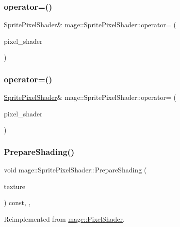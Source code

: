 \subsubsection{\texorpdfstring{operator=()}{operator=()}\hspace{0.1cm}{\footnotesize\ttfamily [1/2]}}
{\footnotesize\ttfamily \hyperlink{classmage_1_1_sprite_pixel_shader}{Sprite\+Pixel\+Shader}\& mage\+::\+Sprite\+Pixel\+Shader\+::operator= (\begin{DoxyParamCaption}\item[{const \hyperlink{classmage_1_1_sprite_pixel_shader}{Sprite\+Pixel\+Shader} \&}]{pixel\+\_\+shader }\end{DoxyParamCaption})\hspace{0.3cm}{\ttfamily [delete]}}

\hypertarget{classmage_1_1_sprite_pixel_shader_ad982c266c5ba3510009a3f5e7519e284}{}\label{classmage_1_1_sprite_pixel_shader_ad982c266c5ba3510009a3f5e7519e284} 
\subsubsection{\texorpdfstring{operator=()}{operator=()}\hspace{0.1cm}{\footnotesize\ttfamily [2/2]}}
{\footnotesize\ttfamily \hyperlink{classmage_1_1_sprite_pixel_shader}{Sprite\+Pixel\+Shader}\& mage\+::\+Sprite\+Pixel\+Shader\+::operator= (\begin{DoxyParamCaption}\item[{\hyperlink{classmage_1_1_sprite_pixel_shader}{Sprite\+Pixel\+Shader} \&\&}]{pixel\+\_\+shader }\end{DoxyParamCaption})\hspace{0.3cm}{\ttfamily [delete]}}

\hypertarget{classmage_1_1_sprite_pixel_shader_a8c0c4daf36c74822a772b1a38e8d876a}{}\label{classmage_1_1_sprite_pixel_shader_a8c0c4daf36c74822a772b1a38e8d876a} 
\subsubsection{\texorpdfstring{Prepare\+Shading()}{PrepareShading()}}
{\footnotesize\ttfamily void mage\+::\+Sprite\+Pixel\+Shader\+::\+Prepare\+Shading (\begin{DoxyParamCaption}\item[{I\+D3\+D11\+Shader\+Resource\+View $\ast$}]{texture }\end{DoxyParamCaption}) const\hspace{0.3cm}{\ttfamily [final]}, {\ttfamily [override]}, {\ttfamily [virtual]}}



Reimplemented from \hyperlink{classmage_1_1_pixel_shader_ab677013145ca252c57e5a001134c01ff}{mage\+::\+Pixel\+Shader}.

